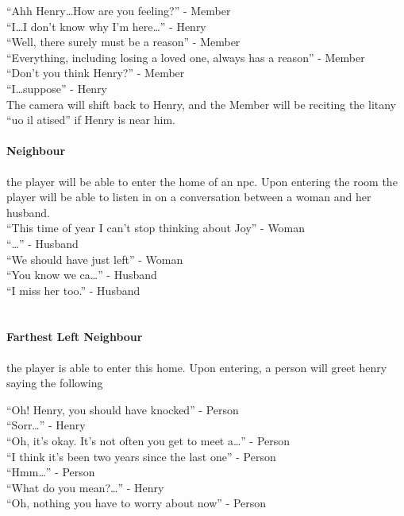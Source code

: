 \documentclass[12pt, a4paper, titlepage]{article}
\begin{document}
            ``Ahh Henry\ldots How are you feeling?'' - Member\\
            ``I\ldots I don't know why I'm here\ldots'' - Henry\\
            ``Well, there surely must be a reason'' - Member\\
            ``Everything, including losing a loved one, always has a reason'' - Member\\
            ``Don't you think Henry?'' - Member\\
            ``I\ldots suppose'' - Henry\\
            
            The camera will shift back to Henry, and the Member will be reciting the litany ``uo il atised'' if Henry is near him.
            
            \paragraph{Neighbour} the player will be able to enter the home of an npc. Upon entering the room the player will be able to listen in on a conversation between a woman and
            her husband.\\
            
            ``This time of year I can't stop thinking about Joy'' - Woman\\
            ``\ldots'' - Husband\\
            ``We should have just left'' - Woman\\
            ``You know we ca\ldots'' - Husband\\
            ``I miss her too.'' - Husband\\~\\

	\paragraph{Farthest Left Neighbour} the player is able to enter this home. Upon entering, a person will greet henry saying the following

	``Oh! Henry, you should have knocked'' - Person\\
	``Sorr\ldots'' - Henry\\
	``Oh, it's okay. It's not often you get to meet a\ldots'' - Person\\
	``I think it's been two years since the last one'' - Person\\
	``Hmm\ldots'' - Person\\
	``What do you mean?\ldots'' - Henry\\
	``Oh, nothing you have to worry about now'' - Person\\
            
\end{document}
